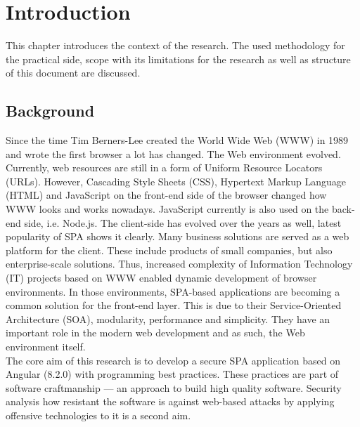\documentclass{article} %
\begin{document}
\section{Introduction}
\normalsize This chapter introduces the context of the research. The used methodology for the practical side, scope with its limitations for the research as well as structure of this document are discussed.
\subsection{Background}
Since the time Tim Berners-Lee created the World Wide Web (WWW) in 1989 \cite{bib:internet_invention} and wrote the first browser a lot has changed. The Web environment evolved. Currently, web resources are still in a form of Uniform Resource Locators (URLs). However, Cascading Style Sheets (CSS), Hypertext Markup Language (HTML) and JavaScript on the front-end side of the browser changed how WWW looks and works nowadays. JavaScript currently is also used on the back-end side, i.e. Node.js. The client-side has evolved over the years as well, latest popularity of SPA shows it clearly. Many business solutions are served as a web platform for the client. These include products of small companies, but also enterprise-scale solutions. Thus, increased complexity of Information Technology (IT) projects based on WWW enabled dynamic development of browser environments. In those environments, SPA-based applications are becoming a common solution for the front-end layer. This is due to their Service-Oriented Architecture (SOA), modularity, performance and simplicity. They have an important role in the modern web development and as such, the Web environment itself.\\
\newline
The core aim of this research is to develop a secure SPA application based on Angular (8.2.0) with programming best practices. These practices are part of software craftmanship --- an approach to build high quality software. Security analysis how resistant the software is against web-based attacks by applying offensive technologies to it is a second aim.\\
\end{document}
